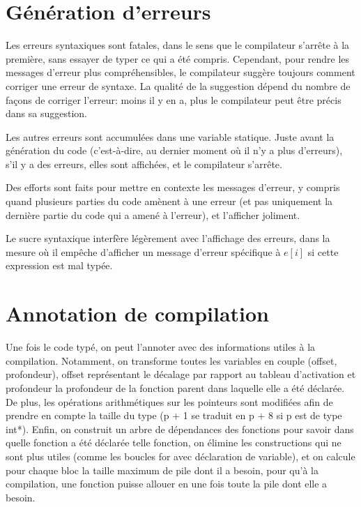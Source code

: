 \documentclass{scrartcl}
\begin{document}
\section*{Génération d'erreurs}
Les erreurs syntaxiques sont fatales, dans le sens que le compilateur s'arrête
à la première, sans essayer de typer ce qui a été compris. Cependant, pour rendre
les messages d'erreur plus compréhensibles, le compilateur suggère toujours
comment corriger une erreur de syntaxe. La qualité de la suggestion dépend du
nombre de façons de corriger l'erreur: moins il y en a, plus le compilateur peut
être précis dans sa suggestion.\par
Les autres erreurs sont accumulées dans une variable statique. Juste avant la génération
du code (c'est-à-dire, au dernier moment où il n'y a plus d'erreurs), s'il y a
des erreurs, elles sont affichées, et le compilateur s'arrête.\par
Des efforts sont faits pour mettre en contexte les messages d'erreur, y compris
quand plusieurs parties du code amènent à une erreur (et pas uniquement la
dernière partie du code qui a amené à l'erreur), et l'afficher joliment.\par
Le sucre syntaxique interfère légèrement avec l'affichage des erreurs, dans la
mesure où il empêche d'afficher un message d'erreur spécifique à \(e[i]\) si
cette expression est mal typée.

\section*{Annotation de compilation}
Une fois le code typé, on peut l'annoter avec des informations utiles à la compilation.
Notamment, on transforme toutes les variables en couple (offset, profondeur), offset représentant
le décalage par rapport au tableau d'activation et profondeur la profondeur de la fonction parent dans
laquelle elle a été déclarée. De plus, les opérations arithmétiques sur les pointeurs sont modifiées afin
de prendre en compte la taille du type (p + 1 se traduit en p + 8 si p est de type int*). Enfin,
on construit un arbre de dépendances des fonctions pour savoir dans quelle fonction a été déclarée
telle fonction, on élimine les constructions qui ne sont plus utiles (comme les boucles for avec
déclaration de variable), et on calcule pour chaque bloc la taille maximum de pile dont il a besoin,
pour qu'à la compilation, une fonction puisse allouer en une fois toute la pile dont elle a besoin.
\end{document}
